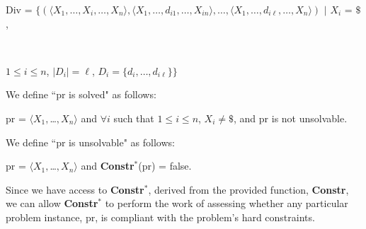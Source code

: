 \documentclass[11pt, oneside]{article}   	%
\begin{document}
\noindent \centerline{Div = $\{(\langle X_1, \dots, X_i, \dots, X_n \rangle, \langle X_1, \dots, d_{i1}, \dots, X_{in} \rangle, \dots, \langle X_1, \dots, d_{i\ell}, \dots, X_n \rangle)$ $\vert$ $X_i$ = $\$$,}\\
\centerline{$1 \le i \le n$, $\vert D_i \vert = \ell$, $D_i = \{d_i, \dots, d_{i\ell}\}\}$}

\noindent We define ``pr is solved" as follows:

\begin{center}
{pr = $\langle$$X_{1}, $\dots$, X_{n}$$\rangle$ and $\forall$$i$ such that $1 \le i \le n$, $X_{i} \neq \$$, and pr is not unsolvable.}
\end{center}

\noindent We define ``pr is unsolvable" as follows:

\begin{center}
{pr = $\langle$$X_{1}, $\dots$, X_{n}$$\rangle$ and \textbf{Constr$^{\ast}$}(pr) = false.}
\end{center}

\noindent Since we have access to \textbf{Constr$^{\ast}$}, derived from the provided function, \textbf{Constr}, we can allow  \textbf{Constr$^{\ast}$} to perform the work of assessing whether any particular problem instance, pr, is compliant with the problem's hard constraints.

\end{document}
